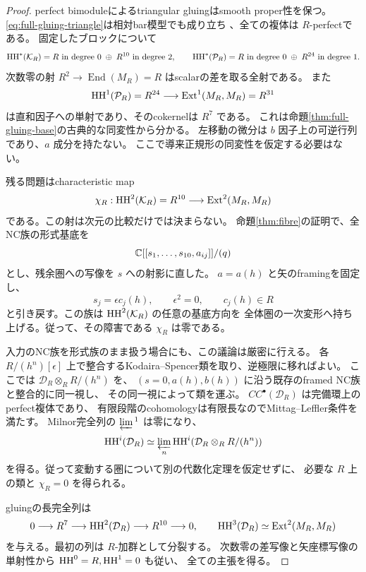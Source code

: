 \begin{proof}
perfect bimoduleによるtriangular gluingはsmooth proper性を保つ。
\eqref{eq:full-gluing-triangle}は相対bar模型でも成り立ち
\cite[Theorem 7.7, Remark 7.8]{Kuz}、全ての複体は $R$-perfectである。
固定したブロックについて
\[
 \operatorname{HH}^*(\mathcal K_R)=R\text{ in degree }0\;\oplus\;R^{10}\text{ in degree }2,
 \qquad
 \operatorname{HH}^*(\mathcal P_R)=R\text{ in degree }0\;\oplus\;R^{24}\text{ in degree }1.
\]
次数零の射 $R^2\to\operatorname{End}(M_R)=R$ はscalarの差を取る全射である。
また
\[
 \operatorname{HH}^1(\mathcal P_R)=R^{24}\longrightarrow\operatorname{Ext}^1(M_R,M_R)=R^{31}
\]
は直和因子への単射であり、そのcokernelは $R^7$ である。
これは命題\ref{thm:full-gluing-base}の古典的な同変性から分かる。
左移動の微分は $b$ 因子上の可逆行列であり、$a$ 成分を持たない。
ここで導来正規形の同変性を仮定する必要はない。

残る問題はcharacteristic map
\begin{equation}\label{eq:gluing-characteristic-arc}
 \chi_R:\operatorname{HH}^2(\mathcal K_R)=R^{10}\longrightarrow\operatorname{Ext}^2(M_R,M_R)
\end{equation}
である。この射は次元の比較だけでは決まらない。
命題\ref{thm:fibre}の証明で、全NC族の形式基底を
\[
 \mathbb C[[s_1,\ldots,s_{10},a_{ij}]]/(q)
\]
とし、残余圏への写像を $s$ への射影に直した。
$a=a(h)$ と矢のframingを固定し、
\[
 s_j=\epsilon c_j(h),\qquad\epsilon^2=0,\qquad c_j(h)\in R
\]
と引き戻す。この族は $\operatorname{HH}^2(\mathcal K_R)$ の任意の基底方向を
全体圏の一次変形へ持ち上げる。従って、その障害である $\chi_R$ は零である。

入力のNC族を形式族のまま扱う場合にも、この議論は厳密に行える。
各 $R/(h^n)[\epsilon]$ 上で整合するKodaira--Spencer類を取り、逆極限に移ればよい。
ここでは $\mathcal D_R\otimes_RR/(h^n)$ を、
$(s=0,a(h),b(h))$ に沿う既存のframed NC族と整合的に同一視し、
その同一視によって類を運ぶ。
$CC^\bullet(\mathcal D_R)$ は完備環上のperfect複体であり、
有限段階のcohomologyは有限長なのでMittag--Leffler条件を満たす。
Milnor完全列の $\varprojlim{}^1$ は零になり、
\[
 \operatorname{HH}^i(\mathcal D_R)\simeq
 \varprojlim_n\operatorname{HH}^i(\mathcal D_R\otimes_RR/(h^n))
\]
を得る。従って変動する圏について別の代数化定理を仮定せずに、
必要な $R$ 上の類と $\chi_R=0$ を得られる。

gluingの長完全列は
\[
 0\longrightarrow R^7\longrightarrow\operatorname{HH}^2(\mathcal D_R)
 \longrightarrow R^{10}\longrightarrow0,
 \qquad
 \operatorname{HH}^3(\mathcal D_R)\simeq\operatorname{Ext}^2(M_R,M_R)
\]
を与える。最初の列は $R$-加群として分裂する。
次数零の差写像と矢座標写像の単射性から $\operatorname{HH}^0=R,\operatorname{HH}^1=0$ も従い、
全ての主張を得る。
\end{proof}

